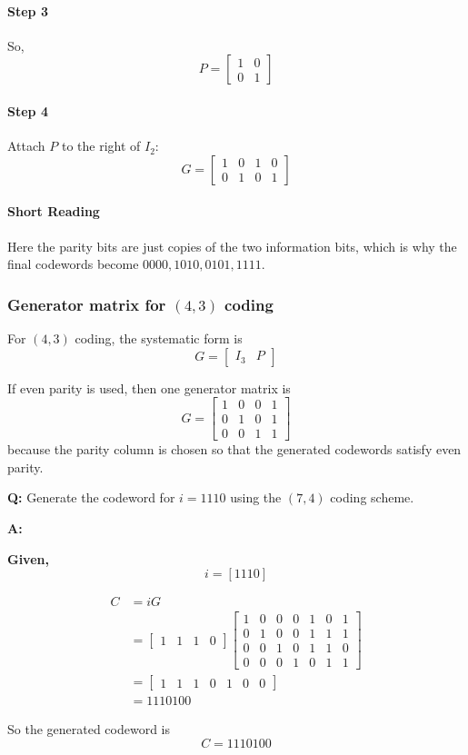 \documentclass[11pt,a4paper]{book}
\newcounter{qna}[chapter]
\renewcommand{\theqna}{\thechapter.\arabic{qna}}
\newenvironment{questionanswerbox}[1][Example]{%
    \refstepcounter{qna}
    \begin{tcolorbox}[
        enhanced,
        breakable,
        colback=softlavender!10,
        colframe=softlavender!200,
        title={#1~\theqna},
        fonttitle=\bfseries,
        coltitle=white,
        colbacktitle=softlavender!200,
        sharp corners,
        boxrule=1pt,
        left=8pt,
        right=8pt,
        top=6pt,
        bottom=6pt
    ]
}{\end{tcolorbox}}
\begin{document}
\paragraph{Step 3}
So,
\[
P=
\begin{bmatrix}
1&0\\
0&1
\end{bmatrix}
\]

\paragraph{Step 4}
Attach \(P\) to the right of \(I_2\):
\[
G=
\left[
\begin{array}{cc|cc}
1&0&1&0\\
0&1&0&1
\end{array}
\right]
\]

\paragraph{Short Reading}
Here the parity bits are just copies of the two information bits, which is why the final codewords become \(0000,1010,0101,1111\).

\subsubsection{Generator matrix for \((4,3)\) coding}
For \((4,3)\) coding, the systematic form is
\[
G=
\left[
\begin{array}{c|c}
I_3 & P
\end{array}
\right]
\]

If even parity is used, then one generator matrix is
\[
G=
\begin{bmatrix}
1&0&0&1\\
0&1&0&1\\
0&0&1&1
\end{bmatrix}
\]
because the parity column is chosen so that the generated codewords satisfy even parity.

\begin{questionanswerbox}[Generator Matrix Codeword Example]
\textbf{Q:} Generate the codeword for \(i=1110\) using the \((7,4)\) coding scheme.

\textbf{A:}

\textbf{Given,}
\[
i=[1110]
\]

\begin{align*}
C &= iG\\
  &= \begin{bmatrix}1&1&1&0\end{bmatrix}
\begin{bmatrix}
1&0&0&0&1&0&1\\
0&1&0&0&1&1&1\\
0&0&1&0&1&1&0\\
0&0&0&1&0&1&1
\end{bmatrix}\\
  &= \begin{bmatrix}1&1&1&0&1&0&0\end{bmatrix}\\
  &= 1110100
\end{align*}

So the generated codeword is
\[
C=1110100
\]
\end{questionanswerbox}
\end{document}
